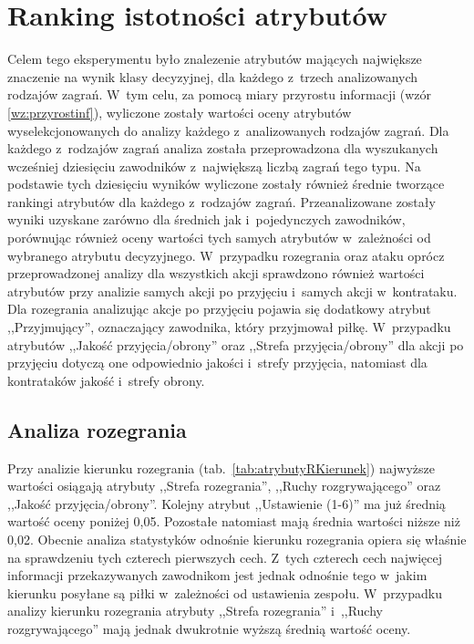 \documentclass[a4paper,twoside,12pt]{book}
\begin{document}
\section{Ranking istotności atrybutów}
Celem tego eksperymentu było znalezenie atrybutów mających największe znaczenie na wynik klasy decyzyjnej, dla każdego z~trzech analizowanych rodzajów zagrań. W~tym celu, za pomocą miary przyrostu informacji (wzór \ref{wz:przyrostinf}), wyliczone zostały wartości oceny atrybutów wyselekcjonowanych do analizy każdego z~analizowanych rodzajów zagrań. Dla każdego z~rodzajów zagrań analiza została przeprowadzona dla wyszukanych wcześniej dziesięciu zawodników z~największą liczbą zagrań tego typu. Na podstawie tych dziesięciu wyników wyliczone zostały również średnie tworzące rankingi atrybutów dla każdego z~rodzajów zagrań. Przeanalizowane zostały wyniki uzyskane zarówno dla średnich jak i~pojedynczych zawodników, porównując również oceny wartości tych samych atrybutów w~zależności od wybranego atrybutu decyzyjnego. W~przypadku rozegrania oraz ataku oprócz przeprowadzonej analizy dla wszystkich akcji sprawdzono również wartości atrybutów przy analizie samych akcji po przyjęciu i~samych akcji w~kontrataku. Dla rozegrania analizując akcje po przyjęciu pojawia się dodatkowy atrybut ,,Przyjmujący'', oznaczający zawodnika, który przyjmował piłkę. W~przypadku atrybutów ,,Jakość przyjęcia/obrony'' oraz ,,Strefa przyjęcia/obrony'' dla akcji po przyjęciu dotyczą one odpowiednio jakości i~strefy przyjęcia, natomiast dla kontrataków jakość i~strefy obrony. 

\subsection{Analiza rozegrania}
Przy analizie kierunku rozegrania (tab.~\ref{tab:atrybutyRKierunek}) najwyższe wartości osiągają atrybuty ,,Strefa rozegrania'', ,,Ruchy rozgrywającego'' oraz ,,Jakość przyjęcia/obrony''. Kolejny atrybut ,,Ustawienie (1-6)'' ma już średnią wartość oceny poniżej 0,05. Pozostałe natomiast mają średnia wartości niższe niż 0,02. Obecnie analiza statystyków odnośnie kierunku rozegrania opiera się właśnie na sprawdzeniu tych czterech pierwszych cech. Z~tych czterech cech najwięcej informacji przekazywanych zawodnikom jest jednak odnośnie tego w~jakim kierunku posyłane są piłki w~zależności od ustawienia zespołu. W~przypadku analizy kierunku rozegrania atrybuty ,,Strefa rozegrania'' i~,,Ruchy rozgrywającego'' mają jednak dwukrotnie wyższą średnią wartość oceny.
\end{document}
